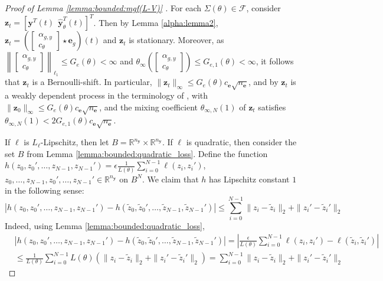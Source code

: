\documentclass{article}
\def\rve{{\mathbf{e}}}
\def\rvy{{\mathbf{y}}}
\def\rvz{{\mathbf{z}}}
\newcommand{\e}{\mathbf{e}}
\newcommand{\y}{\mathbf{y}}
\begin{document}
\begin{proof}[Proof of Lemma \ref{lemma:bounded:mgf(L-V)} ]
 For each $\Sigma(\theta) \in \mathcal{F}$, consider
 $\rvz_t=\left[\y^T(t)~~\hat{\y}_\theta^T(t)\right]^T$.
 Then by Lemma \ref{alpha:lemma2},  \( \rvz_t=\left(\begin{bmatrix} \alpha_{g,y} \\ c_{\theta} \end{bmatrix} \star \e_g\right)(t) \)
 and $\rvz_t$ is stationary. Moreover, as $\left\|\begin{bmatrix}\alpha_{g,y} \\ c_{\theta} \end{bmatrix}\right\|_{\ell_1} \leq G_e(\theta) <\infty$ and $\theta_{\infty}\left(\begin{bmatrix} \alpha_{g,y} \\ c_{\theta} \end{bmatrix}\right) \leq G_{e,1}(\theta) <\infty$, it follows that $\rvz_t$ is a Bernoulli-shift. In particular,  $\|\rvz_t\|_\infty \leq G_e(\theta) c_\rve \sqrt{n_\rve}$, and by \cite[Proposition 4.2]{alquier2013prediction} 
 $\rvz_t$ is a weakly dependent process in the terminology of
 \cite{alquier2013prediction}, with $\|\rvz_0\|_\infty \leq G_e(\theta) c_\rve \sqrt{n_\rve}$, and the mixing coefficient $\theta_{\infty,N}(1)$ of $\rvz_t$ satisfies
 $\theta_{\infty,N}(1) < 2G_{e,1}(\theta)c_\rve \sqrt{n_\rve}$. 

If $\ell$ is $L_\ell$-Lipschitz, then let $B=\mathbb{R}^{n_{\rvy}} 
\times \mathbb{R}^{n_{\rvy}}$. If $\ell$ is quadratic, then consider the set $B$ from Lemma \ref{lemma:bounded:quadratic_loss}.
Define  the function $h(z_0,z_0',\ldots,z_{N-1},z_{N-1}')=\epsilon \frac{1}{L(\theta)} \sum_{i=0}^{N-1} \ell(z_i,z_i')$, $z_0,\ldots, z_{N-1}, z_0',\ldots, z_{N-1}' \in \mathbb{R}^{n_{\rvy}}$ on $B^N$.
We claim that 
 $h$ has Lipschitz constant $1$ in the following sense:
\[ |h(z_0,z_0',\ldots,z_{N-1}, z_{N-1}')-h(\tilde{z}_0, \tilde{z}_0',\ldots,\tilde{z}_{N-1}, \tilde{z}_{N-1}')| \le 
\sum_{i=0}^{N-1}  \|z_i-\tilde{z}_i\|_2 + \|z_i'-\tilde{z}_i'\|_2 \]
Indeed, using Lemma \ref{lemma:bounded:quadratic_loss}, %
\begin{align*}
    & |h(z_0,z_0',\ldots,z_{N-1}, z_{N-1}')-h(\tilde{z}_0, \tilde{z}_0',\ldots,\tilde{z}_{N-1}, \tilde{z}_{N-1}')|
    =\left |\frac{\epsilon}{L(\theta)}\sum_{i=0}^{N-1} \ell(z_i,z_i')-\ell(\tilde{z}_i,\tilde{z}_i') \right |\\
    &\leq \frac{1}{L(\theta)} \sum_{i=0}^{N-1} L(\theta)  (\|z_i-\tilde{z}_i\|_2 + \|z_i'-\tilde{z}_i'\|_2) =
     \sum_{i=0}^{N-1}  \|z_i-\tilde{z}_i\|_2 + \|z_i'-\tilde{z}_i'\|_2
\end{align*}


\end{proof}
\end{document}
